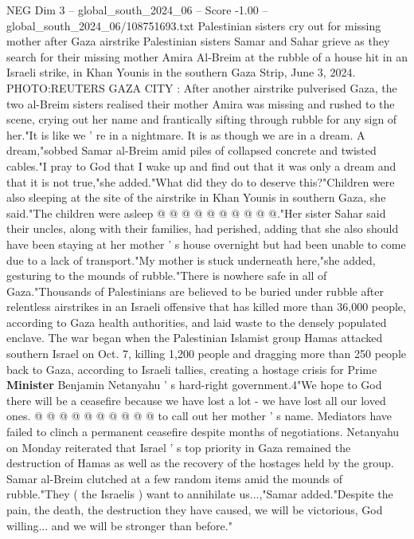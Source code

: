 \begin{textsample}{NEG Dim 3 – global\_south\_2024\_06 – Score -1.00 – global\_south\_2024\_06/108751693.txt}  \label{ex:f3_neg_117}
Palestinian sisters cry out for missing mother after Gaza airstrike Palestinian sisters Samar and Sahar grieve as they search for their missing mother Amira Al-Breim at the rubble of a house hit in an Israeli strike, in Khan Younis in the southern Gaza Strip, June 3, 2024.
PHOTO:REUTERS GAZA CITY : After another airstrike pulverised Gaza, the two al-Breim sisters realised their mother Amira was missing and rushed to the scene, crying out her name and frantically sifting through rubble for any sign of her."It is like we ' re in a nightmare.
It is as though we are in a dream.
A dream,"sobbed Samar al-Breim amid piles of collapsed concrete and twisted cables."I pray to God that I wake up and find out that it was only a dream and that it is not true,"she added."What did they do to deserve this?"Children were also sleeping at the site of the airstrike in Khan Younis in southern Gaza, she said."The children were asleep @ @ @ @ @ @ @ @ @ @."Her sister Sahar said their uncles, along with their families, had perished, adding that she also should have been staying at her mother ' s house overnight but had been unable to come due to a lack of transport."My mother is stuck underneath here,"she added, gesturing to the mounds of rubble."There is nowhere safe in all of Gaza."Thousands of Palestinians are believed to be buried under rubble after relentless airstrikes in an Israeli offensive that has killed more than 36,000 people, according to Gaza health authorities, and laid waste to the densely populated enclave.
The war began when the Palestinian Islamist group Hamas attacked southern Israel on Oct. 7, killing 1,200 people and dragging more than 250 people back to Gaza, according to Israeli tallies, creating a hostage crisis for Prime \textbf{Minister} Benjamin Netanyahu ' s hard-right government.4"We hope to God there will be a ceasefire because we have lost a lot - we have lost all our loved ones. @ @ @ @ @ @ @ @ @ @ to call out her mother ' s name.
Mediators have failed to clinch a permanent ceasefire despite months of negotiations.
Netanyahu on Monday reiterated that Israel ' s top priority in Gaza remained the destruction of Hamas as well as the recovery of the hostages held by the group.
Samar al-Breim clutched at a few random items amid the mounds of rubble."They ( the Israelis ) want to annihilate us...,"Samar added."Despite the pain, the death, the destruction they have caused, we will be victorious, God willing... and we will be stronger than before."

\end{textsample}
